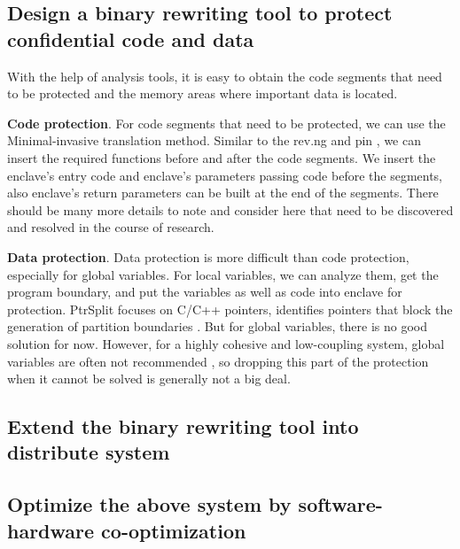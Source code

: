 \subsection{Design a binary rewriting tool to protect confidential code and data}
With the help of analysis tools, it is easy to obtain the code segments that need
to be protected and the memory areas where important data is located.

\textbf{Code protection}. For code segments that need to be protected,
we can use the Minimal-invasive translation method. Similar to the rev.ng \cite{Federico2017revngAU}
and pin \cite{Luk2005PinBC}, we can insert the required functions before and
after the code segments. We insert the enclave's entry code and enclave's parameters passing code
before the segments, also enclave's return parameters can be built at the end of the segments.
There should be many more details to note and consider here that need to be
discovered and resolved in the course of research.

\textbf{Data protection}. Data protection is more difficult than code protection,
especially for global variables.
For local variables, we can analyze them, get the program boundary,
and put the variables as well as code into enclave for protection.
PtrSplit focuses on C/C++ pointers, identifies pointers that block
the generation of partition boundaries \cite{Liu2017PtrSplitSG}.
But for global variables, there is no good solution for now. However,
for a highly cohesive and low-coupling system, global variables are often not recommended
\cite{GlobalVariablesAreBad},
so dropping this part of the protection when it cannot be solved is generally not a big deal. 

\subsection{Extend the binary rewriting tool into distribute system}

\subsection{Optimize the above system by software-hardware co-optimization}

